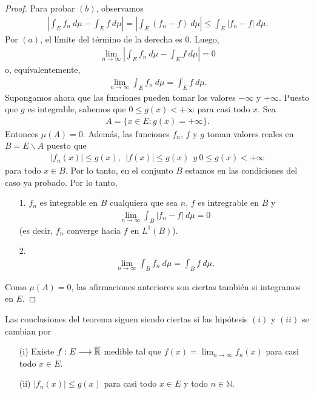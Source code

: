 \begin{proof}
    Para probar $(b)$, observamos
    \begin{align*}
        \left| \int_{E}{f_n \ d\mu} - \int_{E}{f \ d\mu}\right| = \left| \int_{E}{(f_n - f) \ d\mu}\right| \leq \int_{E}{|f_n - f| \ d\mu}.
    \end{align*}
    Por $(a)$, el límite del término de la derecha es 0. Luego,
    \begin{align*}
        \lim_{n \to \infty}{ \left| \int_{E}{f_n \ d\mu} - \int_{E}{f \ d\mu}\right|} = 0
    \end{align*}
    o, equivalentemente,
    \begin{align*}
        \lim_{n \to \infty}{\int_{E}{f_n \ d\mu}} = {\int_{E}{f \ d\mu}}.
    \end{align*}
    Supongamos ahora que las funciones pueden tomar los valores $-\infty$ y $+\infty$. Puesto que $g$ es integrable, sabemos que $0 \leq g(x) < +\infty$ para casi todo $x$. Sea
    \begin{align*}
        A = \{ x \in E : g(x) = +\infty \}.
    \end{align*}
    Entonces $\mu(A) = 0$. Además, las funciones $f_n$, $f$ y $g$ toman valores reales en $B = E \backslash A$ puesto que
    \begin{align*}
        |f_n(x)| \leq g(x), \ \ |f(x)| \leq g(x) \ \ y \ 0 \leq g(x) < +\infty
    \end{align*}
    para todo $x \in B$. Por lo tanto, en el conjunto $B$ estamos en las condiciones del caso ya probado. Por lo tanto,
    \begin{enumerate}
        \item[1.] $f_n$ es integrable en $B$ cualquiera que sea $n$, $f$ es intregrable en $B$ y
              \begin{align*}
                  \lim_{n \to \infty}{\int_{B}{|f_n - f| \ d\mu}} = 0
              \end{align*}
              (es decir, $f_n$ converge hacia $f$ en $L^1(B)$).
        \item[2.]
              \begin{align*}
                  \lim_{n \to \infty}{\int_{B}{f_n \ d\mu}} = {\int_{B}{f \ d\mu}}.
              \end{align*}
    \end{enumerate}
    Como $\mu(A) = 0$, las afirmaciones anteriores son ciertas también si integramos en $E$.
\end{proof}

\begin{obs}
    Las conclusiones del teorema siguen siendo ciertas si las hipótesis $(i)$ y $(ii)$ se cambian por
    \begin{enumerate}
        \item[(i)] Existe $f: E \longrightarrow \overline{\mathbb{R}}$ medible tal que $f(x) = \lim_{n \to \infty}{f_n(x)}$ para casi todo $x \in E$.
        \item[(ii)] $|f_n(x)| \leq g(x)$ para casi todo $x \in E$ y todo $n \in \mathbb{N}$.
    \end{enumerate}
\end{obs}

